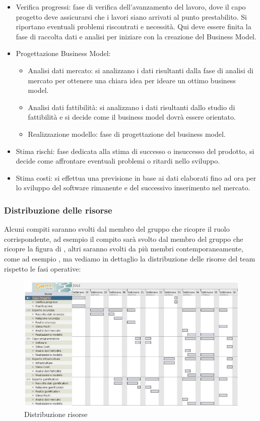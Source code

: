 \begin{itemize}
\begin{itemize}
\end{itemize}
\item Verifica progressi: fase di verifica dell'avanzamento del lavoro, dove il capo progetto deve assicurarsi che i lavori siano arrivati al punto prestabilito. Si riportano eventuali problemi riscontrati e necessità. Qui deve essere finita la fase di raccolta dati e analisi per iniziare con la creazione del Business Model. 
\item Progettazione Business Model:
\begin{itemize}
\item Analisi dati mercato: si analizzano i dati risultanti dalla fase di analisi di mercato per ottenere una chiara idea per ideare un ottimo business model.
\item Analisi dati fattibilità: si analizzano i dati risultanti dallo studio di fattibilità e si decide come il business model dovrà essere orientato.
\item Realizzazione modello: fase di progettazione del business model.
\end{itemize}
\item Stima rischi: fase dedicata alla stima di successo o insuccesso del prodotto, si decide come affrontare eventuali problemi o ritardi nello sviluppo.
\item Stima costi: si effettua una previsione in base ai dati elaborati fino ad ora per lo sviluppo del software rimanente e del successivo inserimento nel mercato.
\end{itemize}

\newpage
\subsubsection{Distribuzione delle risorse}
Alcuni compiti saranno svolti dal membro del gruppo che ricopre il ruolo corrispondente, ad esempio il compito  sarà svolto dal membro del gruppo che ricopre la figura di , altri saranno svolti da più membri contemporaneamente, come ad esempio , ma vediamo in dettaglio la distribuzione delle risorse del team rispetto le fasi operative: \\

\begin{figure}[H]
\centering
\includegraphics[scale=0.65]{images/risorse.png}
\caption{Distribuzione risorse}
\end{figure}

